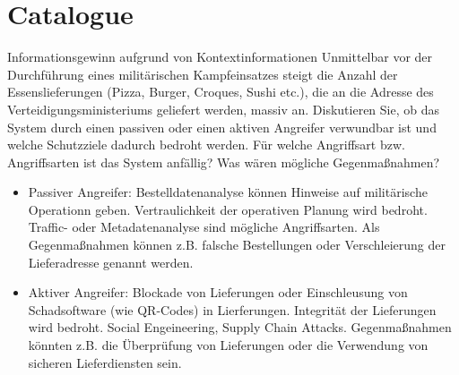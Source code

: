 \documentclass{article}
\begin{document}
\section{Catalogue}

\setcounter{subsection}{34}
\begin{exercise}{Informationsgewinn aufgrund von Kontextinformationen}
  Unmittelbar vor der Durchführung eines militärischen Kampfeinsatzes steigt die Anzahl der Essenslieferungen (Pizza, Burger, Croques, Sushi etc.), die an die Adresse des Verteidigungsministeriums geliefert werden, massiv an. Diskutieren Sie, ob das System durch einen passiven oder einen aktiven Angreifer verwundbar ist und welche Schutzziele dadurch bedroht werden. Für welche Angriffsart bzw. Angriffsarten ist das System anfällig? Was wären mögliche Gegenmaßnahmen?

  \begin{solution}
    \begin{itemize}
      \item Passiver Angreifer: Bestelldatenanalyse können Hinweise auf militärische Operationn geben. Vertraulichkeit der operativen Planung wird bedroht. Traffic- oder Metadatenanalyse sind mögliche Angriffsarten. Als Gegenmaßnahmen können z.B. falsche Bestellungen oder Verschleierung der Lieferadresse genannt werden.
      \item Aktiver Angreifer: Blockade von Lieferungen oder Einschleusung von Schadsoftware (wie QR-Codes) in Lierferungen. Integrität der Lieferungen wird bedroht. Social Engeineering, Supply Chain Attacks. Gegenmaßnahmen könnten z.B. die Überprüfung von Lieferungen oder die Verwendung von sicheren Lieferdiensten sein.
    \end{itemize}
  \end{solution}
\end{exercise}
\end{document}
